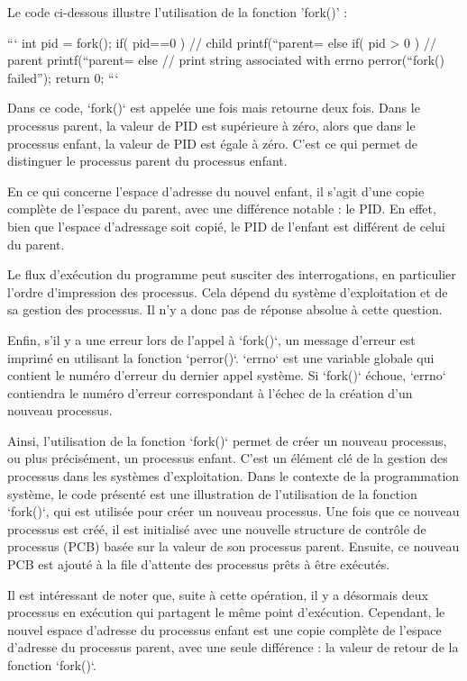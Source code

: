 \documentclass[12pt]{article}
\begin{document}
Le code ci-dessous illustre l'utilisation de la fonction 'fork()' :

```
int pid = fork();   
if( pid==0 ) {     
    // child       
    printf(“parent=%
}   
else if( pid > 0 ) {       
    // parent       
    printf(“parent=%
}   
else { 
    // print string associated with errno
    perror(“fork() failed”);    
}   
return 0; 
```

Dans ce code, `fork()` est appelée une fois mais retourne deux fois. Dans le processus parent, la valeur de PID est supérieure à zéro, alors que dans le processus enfant, la valeur de PID est égale à zéro. C'est ce qui permet de distinguer le processus parent du processus enfant. 

En ce qui concerne l'espace d'adresse du nouvel enfant, il s'agit d'une copie complète de l'espace du parent, avec une différence notable : le PID. En effet, bien que l'espace d'adressage soit copié, le PID de l'enfant est différent de celui du parent.

Le flux d'exécution du programme peut susciter des interrogations, en particulier l'ordre d'impression des processus. Cela dépend du système d'exploitation et de sa gestion des processus. Il n'y a donc pas de réponse absolue à cette question.

Enfin, s'il y a une erreur lors de l'appel à `fork()`, un message d'erreur est imprimé en utilisant la fonction `perror()`. `errno` est une variable globale qui contient le numéro d'erreur du dernier appel système. Si `fork()` échoue, `errno` contiendra le numéro d'erreur correspondant à l'échec de la création d'un nouveau processus.

Ainsi, l'utilisation de la fonction `fork()` permet de créer un nouveau processus, ou plus précisément, un processus enfant. C'est un élément clé de la gestion des processus dans les systèmes d'exploitation.
Dans le contexte de la programmation système, le code présenté est une illustration de l'utilisation de la fonction `fork()`, qui est utilisée pour créer un nouveau processus. Une fois que ce nouveau processus est créé, il est initialisé avec une nouvelle structure de contrôle de processus (PCB) basée sur la valeur de son processus parent. Ensuite, ce nouveau PCB est ajouté à la file d'attente des processus prêts à être exécutés.

Il est intéressant de noter que, suite à cette opération, il y a désormais deux processus en exécution qui partagent le même point d'exécution. Cependant, le nouvel espace d'adresse du processus enfant est une copie complète de l'espace d'adresse du processus parent, avec une seule différence : la valeur de retour de la fonction `fork()`.
\end{document}
